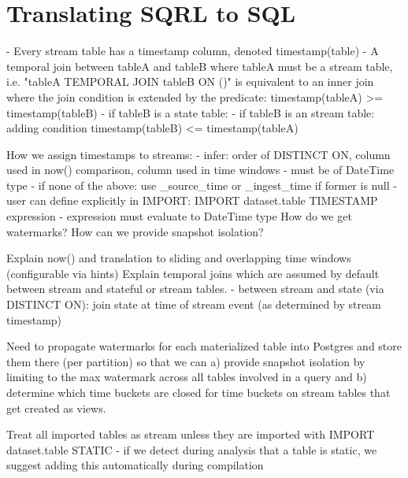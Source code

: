 \documentclass[	DIV=calc,%
							paper=letter,%
							fontsize=11pt,%
							twocolumn]{scrartcl}	 					%
\begin{document}
\appendix

\section{Translating SQRL to SQL}
\label{appendix:sqrl2sql}

- Every stream table has a timestamp column, denoted timestamp(table)
- A temporal join between tableA and tableB where tableA must be a stream table, i.e. "tableA TEMPORAL JOIN tableB ON ()" is equivalent to an inner join where the join condition is extended by the predicate:
    timestamp(tableA) >= timestamp(tableB)
    - if tableB is a state table:
    - if tableB is an stream table: adding condition timestamp(tableB) <= timestamp(tableA)

How we assign timestamps to streams:
    - infer: order of DISTINCT ON, column used in now() comparison, column used in time windows
        - must be of DateTime type
    - if none of the above: use \_source\_time or \_ingest\_time if former is null
    - user can define explicitly in IMPORT: IMPORT dataset.table TIMESTAMP expression
        - expression must evaluate to DateTime type
How do we get watermarks?
How can we provide snapshot isolation?

Explain now() and translation to sliding and overlapping time windows (configurable via hints)
Explain temporal joins which are assumed by default between stream and stateful or stream tables.
    - between stream and state (via DISTINCT ON): join state at time of stream event (as determined by stream timestamp)

Need to propagate watermarks for each materialized table into Postgres and store them there (per partition) so that we can a) provide snapshot isolation by limiting to the max watermark across all tables involved in a query and b) determine which time buckets are closed for time buckets on stream tables that get created as views.

Treat all imported tables as stream unless they are imported with IMPORT dataset.table STATIC
    - if we detect during analysis that a table is static, we suggest adding this automatically during compilation
\end{document}

